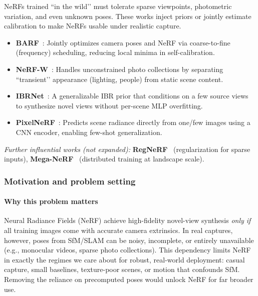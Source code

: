 \begin{enrichment}
    NeRFs trained ``in the wild’’ must tolerate sparse viewpoints, photometric variation, and even unknown poses. These works inject priors or jointly estimate calibration to make NeRFs usable under realistic capture.
    
    \begin{itemize}
        \item \textbf{BARF}~\cite{lin2021_barf}: Jointly optimizes camera poses and NeRF via coarse-to-fine (frequency) scheduling, reducing local minima in self-calibration.
        \item \textbf{NeRF-W}~\cite{martinbrualla2021_nerfw}: Handles unconstrained photo collections by separating ``transient’’ appearance (lighting, people) from static scene content.
        \item \textbf{IBRNet}~\cite{wang2021_ibrnet}: A generalizable IBR prior that conditions on a few source views to synthesize novel views without per-scene MLP overfitting.
        \item \textbf{PixelNeRF}~\cite{yu2020_pixelnerf}: Predicts scene radiance directly from one/few images using a CNN encoder, enabling few-shot generalization.
    \end{itemize}
    
    \noindent\textit{Further influential works (not expanded):} \textbf{RegNeRF}~\cite{niemeyer2022_regnerf} (regularization for sparse inputs), \textbf{Mega-NeRF}~\cite{turki2022_meganerf} (distributed training at landscape scale).
    
    \begin{enrichment}
        \label{enr:subsec_chapter23_barf}
        
        \subsubsection{Motivation and problem setting}
        \label{subsubsec:chapter23_barf_motivation}
        
        \paragraph{Why this problem matters}
        Neural Radiance Fields (NeRF) achieve high-fidelity novel-view synthesis \emph{only if} all training images come with accurate camera extrinsics. In real captures, however, poses from SfM/SLAM can be noisy, incomplete, or entirely unavailable (e.g., monocular videos, sparse photo collections). This dependency limits NeRF in exactly the regimes we care about for robust, real-world deployment: casual capture, small baselines, texture-poor scenes, or motion that confounds SfM. Removing the reliance on precomputed poses would unlock NeRF for far broader use.
        

\end{enrichment}
\end{enrichment}
